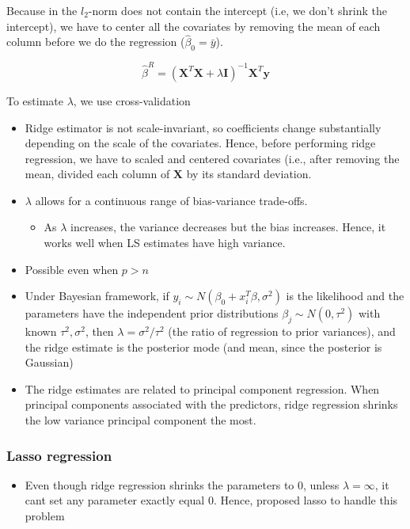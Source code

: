 \documentclass[
]{book}
\providecommand{\tightlist}{%
  \setlength{\itemsep}{0pt}\setlength{\parskip}{0pt}}
\begin{document}
Because in the \(l_2\)-norm does not contain the intercept (i.e, we don't shrink the intercept), we have to center all the covariates by removing the mean of each column before we do the regression (\(\hat{\beta}_0= \bar{y}\)).

\[
\hat{\beta}^R = (\mathbf{X}^T \mathbf{X} + \lambda \mathbf{I})^{-1}\mathbf{X}^T \mathbf{y}
\]

To estimate \(\lambda\), we use cross-validation

\begin{itemize}
\item
  Ridge estimator is not scale-invariant, so coefficients change substantially depending on the scale of the covariates. Hence, before performing ridge regression, we have to scaled and centered covariates (i.e., after removing the mean, divided each column of \(\mathbf{X}\) by its standard deviation.
\item
  \(\lambda\) allows for a continuous range of bias-variance trade-offs.

  \begin{itemize}
  \tightlist
  \item
    As \(\lambda\) increases, the variance decreases but the bias increases. Hence, it works well when LS estimates have high variance.
  \end{itemize}
\item
  Possible even when \(p>n\)
\item
  Under Bayesian framework, if \(y_i \sim N(\beta_0 + x^T_i\beta, \sigma^2)\) is the likelihood and the parameters have the independent prior distributions \(\beta_j \sim N(0, \tau^2)\) with known \(\tau^2, \sigma^2\), then \(\lambda = \sigma^2 / \tau^2\) (the ratio of regression to prior variances), and the ridge estimate is the posterior mode (and mean, since the posterior is Gaussian)
\item
  The ridge estimates are related to principal component regression. When principal components associated with the predictors, ridge regression shrinks the low variance principal component the most.
\end{itemize}

\hypertarget{lasso-regression}{%
\subsubsection{Lasso regression}\label{lasso-regression}}

\begin{itemize}
\tightlist
\item
  Even though ridge regression shrinks the parameters to 0, unless \(\lambda= \infty\), it cant set any parameter exactly equal 0. Hence, \citet{tibshirani1996} proposed lasso to handle this problem
\end{itemize}
\end{document}
